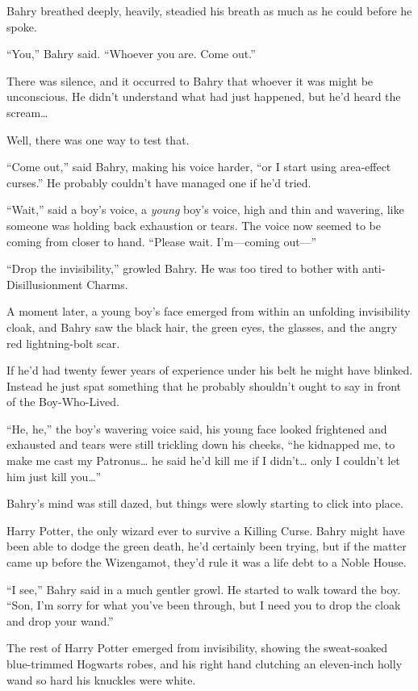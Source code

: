 Bahry breathed deeply, heavily, steadied his breath as much as he could
before he spoke.

``You,'' Bahry said. ``Whoever you are. Come out.''

There was silence, and it occurred to Bahry that whoever it was might be
unconscious. He didn't understand what had just happened, but he'd heard
the scream\ldots{}

Well, there was one way to test that.

``Come out,'' said Bahry, making his voice harder, ``or I start using
area-effect curses.'' He probably couldn't have managed one if he'd
tried.

``Wait,'' said a boy's voice, a \emph{young} boy's voice, high and thin
and wavering, like someone was holding back exhaustion or tears. The
voice now seemed to be coming from closer to hand. ``Please wait.
I'm---coming out---''

``Drop the invisibility,'' growled Bahry. He was too tired to bother
with anti-Disillusionment Charms.

A moment later, a young boy's face emerged from within an unfolding
invisibility cloak, and Bahry saw the black hair, the green eyes, the
glasses, and the angry red lightning-bolt scar.

If he'd had twenty fewer years of experience under his belt he might
have blinked. Instead he just spat something that he probably shouldn't
ought to say in front of the Boy-Who-Lived.

``He, he,'' the boy's wavering voice said, his young face looked
frightened and exhausted and tears were still trickling down his cheeks,
``he kidnapped me, to make me cast my Patronus\ldots{} he said he'd kill
me if I didn't\ldots{} only I couldn't let him just kill you\ldots{}''

Bahry's mind was still dazed, but things were slowly starting to click
into place.

Harry Potter, the only wizard ever to survive a Killing Curse. Bahry
might have been able to dodge the green death, he'd certainly been
trying, but if the matter came up before the Wizengamot, they'd rule it
was a life debt to a Noble House.

``I see,'' Bahry said in a much gentler growl. He started to walk toward
the boy. ``Son, I'm sorry for what you've been through, but I need you
to drop the cloak and drop your wand.''

The rest of Harry Potter emerged from invisibility, showing the
sweat-soaked blue-trimmed Hogwarts robes, and his right hand clutching
an eleven-inch holly wand so hard his knuckles were white.

